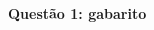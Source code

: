 \documentclass[oneside,12pt]{article}
\begin{document}
\newpage


\pu

\unitlength=8pt

$\begin{array}{ll}
 \ga{fig f}  \phantom{mm} & \ga{fig f}  \\ \\
 \ga{grid F} & \ga{grid F} \\ \\
 \ga{grid F} & \ga{grid F} \\
 \end{array}
$


\newpage


%

{\bf Questão 1: gabarito}
\end{document}
